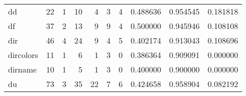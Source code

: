 \begin{longtable}{lrrrrrrrrr}
dd        &                                       22 &                                                  1 &                                                 10 &                                                  4 &                                                  3 &                                                  4 &                                           0.488636 &                               0.954545 &                             0.181818 \\
df        &                                       37 &                                                  2 &                                                 13 &                                                  9 &                                                  9 &                                                  4 &                                           0.500000 &                               0.945946 &                             0.108108 \\
dir       &                                       46 &                                                  4 &                                                 24 &                                                  9 &                                                  4 &                                                  5 &                                           0.402174 &                               0.913043 &                             0.108696 \\
dircolors &                                       11 &                                                  1 &                                                  6 &                                                  1 &                                                  3 &                                                  0 &                                           0.386364 &                               0.909091 &                             0.000000 \\
dirname   &                                       10 &                                                  1 &                                                  5 &                                                  1 &                                                  3 &                                                  0 &                                           0.400000 &                               0.900000 &                             0.000000 \\
du        &                                       73 &                                                  3 &                                                 35 &                                                 22 &                                                  7 &                                                  6 &                                           0.424658 &                               0.958904 &                             0.082192 \\

\end{longtable}
